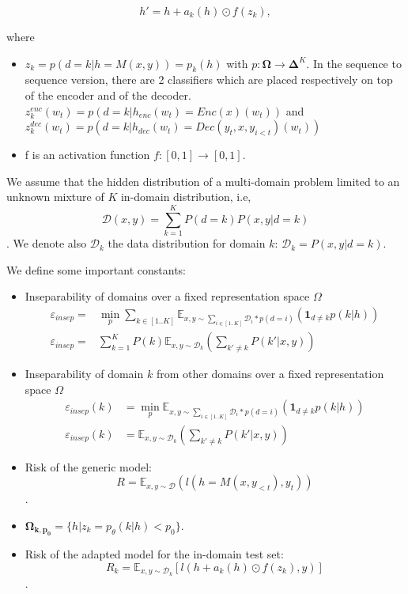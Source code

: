 \documentclass[12pt,times,a4paper,twoside]{article}
\newcommand{\fyTodo}[1]{\Todo[FY:]{\textcolor{orange}{#1}}}
\newcommand{\fyDone}[1]{\done[FY]\Todo[FY:]{\textcolor{orange}{#1}}}
\theoremstyle{definition}
\begin{document}
\begin{equation}
  h' = h + a_k(h) \odot f(z_k), 
\label{eq:2}
\end{equation}

\noindent{}where
\begin{itemize}
\item $z_k = p(d=k | h=M(x,y)) = p_k(h)$ with $p: \mathbf{\Omega} \rightarrow \mathbf{\Delta}^{K}$\fyTodo{This is an overkill}. In the sequence to sequence version, there are 2 classifiers which are placed respectively on top of the encoder and of the decoder.
$z^{enc}_k(w_t) = p(d=k| h_{enc}(w_t)=Enc(x)(w_t))$ and $z^{dec}_k(w_t) = p(d=k| h_{dec}(w_t)=Dec(y_t,x,y_{i<t})(w_t))$
\fyTodo{Attention à $x$ et $y$}
\item f is an activation function $f: [0,1] \rightarrow [0,1]$.
\end{itemize}

We assume that the hidden distribution of a multi-domain problem limited to an unknown mixture of $K$ in-domain distribution, i.e, $$\mathcal{D}(x,y) = \sum_{k=1}^{K} P(d=k) P(x,y|d=k)$$. We denote also $\mathcal{D}_k$ the data distribution for domain $k$: $\mathcal{D}_k = P(x,y|d=k)$.

We define some important constants:
\begin{itemize}
\item Inseparability of domains over a fixed representation space $\Omega$\fyTodo{ugly equation, is my version better ?}
\begin{align}
  \varepsilon_{insep} =& \min_{p} \sum_{k\in[1..K]} \mathbb{E}_{x,y \sim \sum_{i\in [1..K]} \mathcal{D}_{i}*p(d=i)}(\mathbf{1}_{d\neq k} p(k|h)) \\
  \varepsilon_{insep} =& \sum_{k=1}^K P(k)  \mathbb{E}_{x,y \sim \mathcal{D}_k} (\sum_{k' \neq k} P(k'|x,y))
\end{align}

\fyTodo{This does not depend on anything, this is how are data is but we can not know it} 
\item Inseparability of domain $k$ from other domains over a fixed representation space $\Omega$
  \begin{align}
    \varepsilon_{insep}(k) &= \min_{p} \mathbb{E}_{x,y \sim \sum_{i\in [1..K]} \mathcal{D}_{i}*p(d=i)}(\mathbf{1}_{d\neq k} p(k|h)) \\
    \varepsilon_{insep}(k) &= \mathbb{E}_{x,y \sim \mathcal{D}_k} (\sum_{k' \neq k} P(k'|x,y))    
  \end{align}
\item Risk of the generic model: $$R = \mathbb{E}_{x,y \sim\mathcal{D}}(l(h = M(x, y_{<t}), y_t))$$.\fyDone{wrt to which distribution ?}\fyTodo{is $x$ a sequence ? then we need to sum over $t$ to get the loss}
\item $\mathbf{\Omega_{k,p_{0}}} = \lbrace h | z_k = p_\theta(k|h) < p_0\rbrace$.
\item Risk of the adapted model for the in-domain test set:\fyTodo{Use same notations as before}
  $$R_k = \mathbb{E}_{x,y \sim \mathcal{D}_k} [l(h + a_k(h) \odot f(z_k), y)]$$.
\end{itemize}
\end{document}
